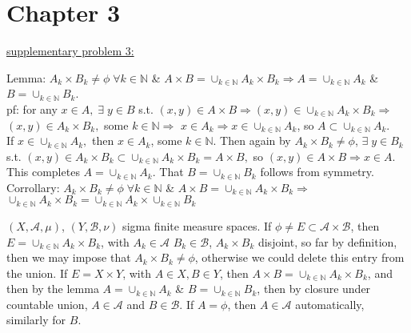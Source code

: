 \documentclass[12pt]{article}
\newcommand{\nats}[0] { \mathbb{N}}
\newcommand{\A}[0] { \mathcal{A} }
\newcommand{\B}[0] { \mathcal{B} }
\newcommand{\rimply}[0] { \Rightarrow }
\begin{document}
\newpage



\section*{Chapter 3}

\begin{flushleft}
\underline{supplementary problem 3:}
\end{flushleft}

\begin{flushleft}
Lemma: $A_k \times B_k \not = \phi \; \forall k \in \nats$ \& $A \times B = \cup_{k \in \nats} A_k \times B_k \rimply A = \cup_{k \in \nats} A_k$ \& $B = \cup_{k \in \nats} B_k$.\\
pf: for any $x \in A, \; \exists \; y \in B $ s.t. $(x, y ) \in A \times B \rimply (x, y ) \in \cup_{k \in \nats} A_k \times B_k \rimply $ $ (x, y ) \in A_k \times B_k, $ some $k \in \nats \rimply $ $x \in A_k \rimply x \in \cup_{k \in \nats} A_k$, so $ A \subset \cup_{k \in \nats} A_k$. \\
If $x \in \cup_{k \in \nats} A_k, $ then $ x \in A_k$, some $k \in \nats$. Then again by $A_k \times B_k \not = \phi$, $\exists \; y \in B_k$ s.t. $(x,y) \in A_k \times B_k \subset \cup_{k \in \nats} A_k \times B_k = A \times B,$ so $(x,y) \in A \times B \rimply x \in A.$ This completes $ A = \cup_{k \in \nats} A_k$. That $B = \cup_{k \in \nats} B_k$ follows from symmetry. \\
Corrollary: $A_k \times B_k \not = \phi \; \forall k \in \nats$ \& $A \times B = \cup_{k \in \nats} A_k \times B_k \rimply $ $\cup_{k \in \nats} A_k \times B_k = \cup_{k \in \nats} A_k \times \cup_{k \in \nats} B_k $
\end{flushleft}


\begin{flushleft}
$ (X, \A, \mu )$, $ (Y, \B, \nu )$  sigma finite measure spaces. If $ \phi \not = E \subset \A \times \B$, then $E = \cup_{k \in \nats} A_k \times B_k $, with $A_k \in \A$ $B_k \in \B$, $A_k \times B_k$ disjoint, so far by definition, then we may impose that $A_k \times B_k \not = \phi$, otherwise we could delete this entry from the union. If $E = X \times Y$, with $A \in X, B \in Y$, then $ A \times B = \cup_{k \in \nats} A_k \times B_k$, and then by the lemma $ A = \cup_{k \in \nats} A_k$ \& $B = \cup_{k \in \nats} B_k$, then by closure under countable union, $A \in \A$ and $B \in \B$. If $A = \phi$, then $A \in \A$ automatically, similarly for $B$.
\end{flushleft}
\end{document}
